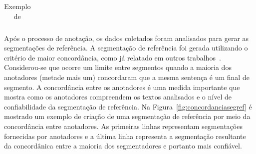\begin{table}[!h]
\begin{tabular}{|p{0.2cm}p{}|}







	\end{tabular}
	\caption{Exemplo de }
	\label{tab:segmentacaoreferencia}
\end{table}









  
  Após o processo de anotação, os dados coletados foram analisados para gerar as segmentações de referência. A segmentação de referência foi gerada utilizando o critério de maior concordância, como já relatado em outros trabalhos~\cite{Hearst1997, Cardoso2017, Kazantseva2012, Passonneau1997, Galley2003}. Considerou-se que ocorre um limite entre segmentos quando a maioria dos anotadores (metade mais um) concordaram que a mesma sentença é um final de segmento. A concordância entre os anotadores é uma medida importante que mostra como os anotadores compreendem os textos analisados e o nível de confiabilidade da segmentação de referência. Na Figura~\ref{fig:concordanciasegref} é mostrado um exemplo de criação de uma segmentação de referência por meio da concordância entre anotadores. As primeiras linhas representam segmentações fornecidas por anotadores e a última linha representa a segmentação resultante da concordânica entre a maioria dos segmentadores e portanto mais confiável. 


